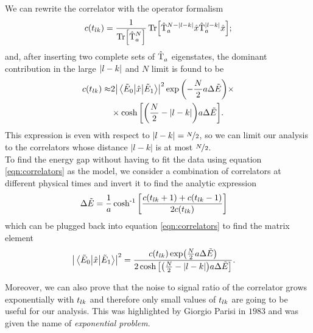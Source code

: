 We can rewrite the correlator with the operator formalism
\begin{align}
  c(t_{lk}) = \frac{1}{\Tr[\hat{\operatorname{T}}_a^{N}]}\Tr[\hat{\operatorname{T}}_a^{N-\abs{l-k}}\hat{x}\hat{\operatorname{T}}_a^{\abs{l-k}}\hat{x}];
\end{align}
and, after inserting two complete sets of $\hat{\operatorname{T}}_a^{}$ eigenstates, the dominant contribution
in the large $\abs{l-k}$ and $N$ limit is found to be
\begin{align}
  \label{eqn:correlators}
  c(t_{lk}) \approx& 2\abs{\mel{\tilde{E}_0}{\hat{x}}{\tilde{E}_1}} ^2 \exp\qty(-\frac{N}{2}a\Delta \tilde{E})\times\notag\\&\times\cosh\qty[\qty(\frac{N}{2}-|l-k|)a\Delta \tilde{E}].
\end{align}
This expression is even with respect to $|l-k| = \nicefrac{N}{2}$, so we can limit our analysis to the correlators whose distance  $|l-k|$ is at most $\nicefrac{N}{2}$.\\
To find the energy gap without having to fit the data using equation \ref{eqn:correlators} as the model, we consider a combination
of correlators at different physical times and invert it to find the analytic expression
\begin{align}
  &\Delta \tilde{E} = \frac{1}{a}\operatorname{cosh^{-1}}\qty[\frac{c(t_{lk}+1) + c(t_{lk}-1)}{2c(t_{lk})}] \label{eqn:energy}
\end{align}
which can be plugged back into equation \ref{eqn:correlators} to find the matrix element
\begin{align}
  &\abs{\mel{\tilde{E}_0}{\hat{x}}{\tilde{E}_1}} ^2 = \frac{c(t_{lk})\exp(\frac{N}{2}a\Delta \tilde{E})}{2\cosh\qty[\qty(\frac{N}{2}-|l-k|)a\Delta \tilde{E}]}\label{eqn:matelem}.
\end{align}

Moreover, we can also prove that the noise to signal ratio of the correlator
grows exponentially with $t_{lk}$  and therefore only small values of $t_{lk}$ are going to be useful for
our analysis. This was highlighted by Giorgio Parisi in $1983$ and was given the name of \textit{exponential problem}.

